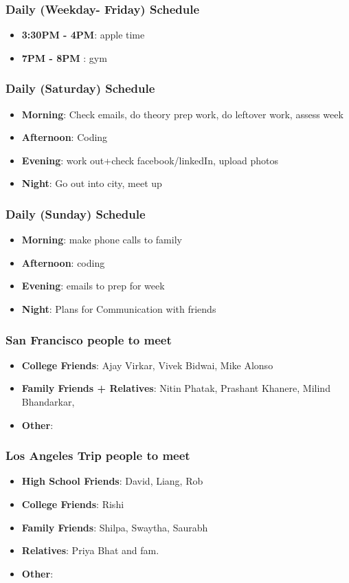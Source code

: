 \begin{frame} 
\frametitle{Daily (Weekday- Friday) Schedule} 
\begin{itemize}
\item \textbf{3:30PM - 4PM}: apple time 
\item \textbf{7PM - 8PM} : gym  
\end{itemize} 
\end{frame}

\begin{frame} 
\frametitle{Daily (Saturday) Schedule}
\begin{itemize} 
\item \textbf{Morning}:
Check emails, 
do theory prep work, 
do leftover work, 
assess week 
\item \textbf{Afternoon}: Coding 
\item \textbf{Evening}: work out+check facebook/linkedIn, upload photos
\item \textbf{Night}: Go out into city, meet up 
\end{itemize} 
\end{frame}

\begin{frame} 
\frametitle{Daily (Sunday) Schedule}
\begin{itemize} 
\item \textbf{Morning}: make phone calls to family 
\item \textbf{Afternoon}: coding
\item \textbf{Evening}: emails to prep for week 
\item \textbf{Night}: Plans for Communication with friends  
\end{itemize} 
\end{frame}

\begin{frame} 
\frametitle{San Francisco people to meet}
\begin{itemize} 
\item \textbf{College Friends}: Ajay Virkar, Vivek Bidwai, Mike Alonso 
\item \textbf{Family Friends + Relatives}:  Nitin Phatak, Prashant Khanere, Milind Bhandarkar, 
\item \textbf{Other}: 
\end{itemize} 
\end{frame}

\begin{frame} 
\frametitle{Los Angeles Trip people to meet}
\begin{itemize} 
\item \textbf{High School Friends}: David, Liang, Rob 
\item \textbf{College Friends}: Rishi 
\item \textbf{Family Friends}: Shilpa, Swaytha, Saurabh
\item \textbf{Relatives}: Priya Bhat and fam. 
\item \textbf{Other}: 
\end{itemize} 
\end{frame}

